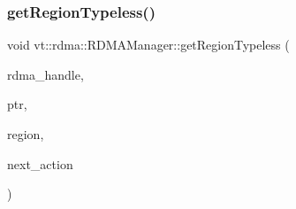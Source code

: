 \mbox{\label{structvt_1_1rdma_1_1_r_d_m_a_manager_a108e405a633745d46c2d68a1a0727b7c}} 
\subsubsection{\texorpdfstring{get\+Region\+Typeless()}{getRegionTypeless()}}
{\footnotesize\ttfamily void vt\+::rdma\+::\+R\+D\+M\+A\+Manager\+::get\+Region\+Typeless (\begin{DoxyParamCaption}\item[{\hyperlink{namespacevt_a10442579ec4e7ebef223818e64bcf908}{R\+D\+M\+A\+\_\+\+Handle\+Type} const \&}]{rdma\+\_\+handle,  }\item[{\hyperlink{namespacevt_a9e2c953286c7616f7c218e9951790776}{R\+D\+M\+A\+\_\+\+Ptr\+Type} const \&}]{ptr,  }\item[{\hyperlink{structvt_1_1rdma_1_1_r_d_m_a_manager_aafc574f533ebf5b34c1389ef504448bf}{R\+D\+M\+A\+\_\+\+Region\+Type} const \&}]{region,  }\item[{\hyperlink{namespacevt_ae0a5a7b18cc99d7b732cb4d44f46b0f3}{Action\+Type}}]{next\+\_\+action }\end{DoxyParamCaption})}

\mbox{\label{structvt_1_1rdma_1_1_r_d_m_a_manager_a267d1a2da52abf259119da964b9051f0}} 
